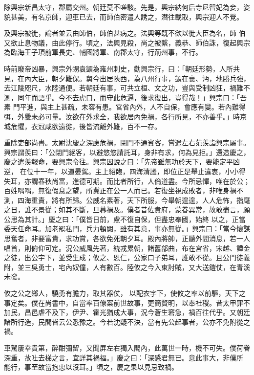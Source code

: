 \begin{pinyinscope}
 除興宗新昌太守，郡屬交州。朝廷莫不嗟駭。先是，興宗納何后寺尼智妃為妾，姿貌甚美，有名京師，迎車已去，而師伯密遣人誘之，潛往載取，興宗迎人不覺。



 及興宗被徙，論者並云由師伯，師伯甚病之。法興等既不欲以徙大臣為名，師
 伯又欲止息物議，由此停行。頃之，法興見殺，尚之被繫，義恭、師伯誅，復起興宗為臨海王子頊前軍長史、輔國將軍、南郡太守，行荊州事，不行。



 時前廢帝凶暴，興宗外甥袁顗為雍州刺史，勸興宗行，曰：「朝廷形勢，人所共見，在內大臣，朝夕難保。舅今出居陜西，為八州行事，顗在襄、沔，地勝兵強，去江陵咫尺，水陸通便。若朝廷有事，可共立桓、文之功，豈與受制凶狂，禍難不測，同年而語乎。今不去虎口，而守此危逼，後求復出，豈得哉！」興宗曰：「吾素
 門平進，與主上甚疏，未容有患。宮省內外，人不自保，會應有變。若內難得弭，外釁未必可量。汝欲在外求全，我欲居內免禍，各行所見，不亦善乎。」時京城危懼，衣冠咸欲遠徙，後皆流離外難，百不一存。



 重除吏部尚書。太尉沈慶之深慮危禍，閉門不通賓客，嘗遣左右范羨詣興宗屬事。興宗謂羨曰：「公閉門絕客，以避悠悠請託耳，身非有求，何為見拒。」還造慶之，慶之遣羨報命，要興宗令往。興宗因說之曰：「先帝雖無功於天下，要能定平凶逆，
 在位十一年，以道晏駕。主上紹臨，四海清謐，即位正是舉止違衷，小小得失耳，亦謂春秋尚富，進德可期。而比者所行，人倫道盡。今所忌憚，唯在於公；百姓喁喁，無復假息之望，所冀正在公一人而已。若復坐視成敗者，非唯身禍不測，四海重責，將有所歸。公威名素著，天下所服，今舉朝遑遑，人人危怖，指麾之日，誰不景從；如其不斷，旦暮禍及。僕者昔佐貴府，蒙眷異常，故敢盡言，願公思為其計。」慶之曰：「僕皆日前，慮不復自保，但盡忠奉國，始終
 以之，正當委天任命耳。加老罷私門，兵力頓闕，雖有其意，事亦無從。」興宗曰：「當今懷謀思奮者，非要富貴，求功賞，各欲免死朝夕耳。殿內將帥，正聽外間消息，若一人唱首，則俯仰可定。況公威風先著，統戎累朝，諸舊部曲，布在宮省，宋越、譚金之徒，出公宇下，並受生成；攸之、恩仁，公家口子弟耳，誰敢不從。且公門徒義附，並三吳勇士，宅內奴僮，人有數百。陸攸之今入東討賊，又大送鎧仗，在青溪未發。



 攸之公之鄉人，驍勇有膽力，取其器仗，
 以配衣宇下，使攸之率以前驅，天下之事定矣。僕在尚書中，自當率百僚案前世故事，更簡賢明，以奉社稷。昔太甲罪不加民，昌邑虐不及下，伊尹、霍光猶成大事，況今蒼生窘急，禍百往代乎。又朝廷諸所行造，民間皆云公悉豫之。今若沈疑不決，當有先公起事者，公亦不免附從之禍。



 車駕屢幸貴第，醉酣彌留，又聞屏左右獨入閣內，此萬世一時，機不可失。僕荷眷深重，故吐去梯之言，宜詳其禍福。」慶之曰：「深感君無已。意此事大，非僕所
 能行，事至故當抱忠以沒耳。」頃之，慶之果以見忌致禍。




\end{pinyinscope}
